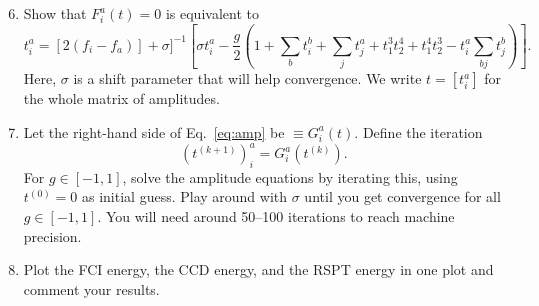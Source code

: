 \documentclass{report}
\begin{document}
\begin{enumerate}[label=\emph{\alph*})]\setcounter{enumi}{5}
\item
  Show that $F_i^a(t)=0$ is equivalent to 
  \begin{equation}
     t_i^a = [2(f_i - f_a)] + \sigma]^{-1}\left[\sigma t_i^a - \frac{g}{2}\left(1 + \sum_b t_i^b + \sum_j t_j^a + t_1^3 t_2^4 + t_1^4 t_2^3 - t_i^a \sum_{bj} t_j^b\right)\right].
      \label{eq:amp}
  \end{equation}
  Here, $\sigma$ is a shift parameter that will help convergence. We write $t = [t_i^a]$ for the whole matrix of amplitudes.
\item
  Let the right-hand side of Eq.~\eqref{eq:amp} be $\equiv G_i^a(t)$. Define the iteration
  \[ (t^{(k+1)})_i^a = G_i^a(t^{(k)}). \]
  For $g\in [-1,1]$, solve the amplitude equations by iterating this, using $t^{(0)} = 0$ as initial guess. Play around with $\sigma$ until you get convergence for all $g\in[-1,1]$. You will need around 50--100 iterations to reach machine precision. 

\item
  Plot the FCI energy, the CCD energy, and the RSPT energy in one plot and comment your results.
\end{enumerate}



 
\end{document}
